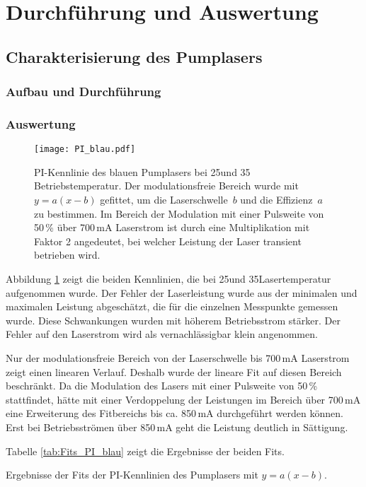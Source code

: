 \section{Durchführung und Auswertung}

\subsection{Charakterisierung des Pumplasers}


\subsubsection{Aufbau und Durchführung}

\subsubsection{Auswertung}

\begin{figure}[H]
\begin{center}
  \texttt{[image: PI\_blau.pdf]}
  \caption{PI-Kennlinie des blauen Pumplasers bei 25\grad und 35\grad
  Betriebstemperatur. Der modulationsfreie Bereich wurde mit $y=a(x-b)$
  gefittet, um die Laserschwelle~$b$ und die Effizienz~$a$ zu bestimmen. Im
  Bereich der Modulation mit einer Pulsweite von 50\,\% über 700\,mA Laserstrom ist durch eine
  Multiplikation mit Faktor 2 angedeutet, bei welcher Leistung der Laser
  transient betrieben wird.}
  \label{img:PI_blau}
\end{center}

\end{figure}

Abbildung \ref{img:PI_blau} zeigt die beiden Kennlinien, die bei 25\grad und 35\grad Lasertemperatur
aufgenommen wurde.
Der Fehler der Laserleistung wurde aus der minimalen und maximalen Leistung abgeschätzt, die für die
einzelnen Messpunkte gemessen wurde.
Diese Schwankungen wurden mit höherem Betriebsstrom stärker.
Der Fehler auf den Laserstrom wird als vernachlässigbar klein angenommen.

 Nur der modulationsfreie Bereich von der Laserschwelle bis 700\,mA Laserstrom
zeigt einen linearen Verlauf.
Deshalb wurde der lineare Fit auf diesen Bereich beschränkt.
Da die Modulation des Lasers mit einer Pulsweite von 50\,\% stattfindet, hätte mit einer
Verdoppelung der Leistungen im Bereich über 700\,mA eine Erweiterung des Fitbereichs bis ca. 850\,mA
durchgeführt werden können. Erst bei Betriebsströmen über 850\,mA geht die Leistung deutlich in
Sättigung.

Tabelle \ref{tab:Fits_PI_blau} zeigt die Ergebnisse der beiden Fits.


\begin{table}[htb]
\caption{Ergebnisse der Fits der PI-Kennlinien des Pumplasers mit $y=a(x-b)$.}

\label{tab:Fits_PI_blau}
\end{table}

\FloatBarrier
 